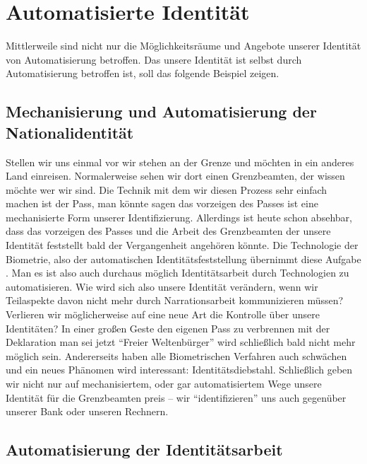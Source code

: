\section {Automatisierte Identität}

Mittlerweile sind nicht nur die Möglichkeitsräume und Angebote unserer Identität von Automatisierung betroffen.
Das unsere Identität ist selbst durch Automatisierung betroffen ist, soll das folgende Beispiel zeigen.

\subsection {Mechanisierung und Automatisierung der Nationalidentität}

Stellen wir uns einmal vor wir stehen an der Grenze und möchten in ein anderes Land einreisen.
Normalerweise sehen wir dort einen Grenzbeamten, der wissen möchte wer wir sind.
Die Technik mit dem wir diesen Prozess sehr einfach machen ist der Pass, man könnte sagen das vorzeigen des Passes ist eine mechanisierte Form unserer Identifizierung.
Allerdings ist heute schon absehbar, dass das vorzeigen des Passes und die Arbeit des Grenzbeamten der unsere Identität feststellt bald der Vergangenheit angehören könnte.
Die Technologie der Biometrie, also der automatischen Identitätsfeststellung übernimmt diese Aufgabe \parencite{knaut}.
Man es ist also auch durchaus möglich Identitätsarbeit durch Technologien zu automatisieren.
Wie wird sich also unsere Identität verändern, wenn wir Teilaspekte davon nicht mehr durch Narrationsarbeit kommunizieren müssen?
Verlieren wir möglicherweise auf eine neue Art die Kontrolle über unsere Identitäten?
In einer großen Geste den eigenen Pass zu verbrennen mit der Deklaration man sei jetzt \enquote{Freier Weltenbürger} wird schließlich bald nicht mehr möglich sein.
Andererseits haben alle Biometrischen Verfahren auch schwächen und ein neues Phänomen wird interessant: Identitätsdiebstahl.
Schließlich geben wir nicht nur auf mechanisiertem, oder gar automatisiertem Wege unsere Identität für die Grenzbeamten preis – wir \enquote{identifizieren} uns auch gegenüber unserer Bank oder unseren Rechnern.

\subsection {Automatisierung der Identitätsarbeit}

